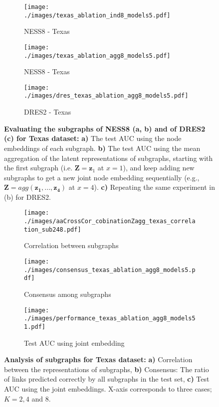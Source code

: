 \documentclass{article}
\begin{document}
\begin{figure}[ht]
\vskip 0.2in
\begin{center}
     \begin{subfigure}[c]{0.32\columnwidth}
        \texttt{[image: ./images/texas\_ablation\_ind8\_models5.pdf]}
         \caption{NESS8 - Texas}
     \end{subfigure}
     \begin{subfigure}[c]{0.29\columnwidth}
        \texttt{[image: ./images/texas\_ablation\_agg8\_models5.pdf]}
         \caption{NESS8 - Texas}
     \end{subfigure}
     \begin{subfigure}[c]{0.32\columnwidth}
        \texttt{[image: ./images/dres\_texas\_ablation\_agg8\_models5.pdf]}
         \caption{DRES2 - Texas}
     \end{subfigure}

\caption{\textbf{Evaluating the subgraphs of NESS8 (a, b) and of DRES2 (c) for Texas dataset:} \textbf{a)} The test AUC using the node embeddings of each subgraph. \textbf{b)} The test AUC using the mean aggregation of the latent representations of subgraphs, starting with the first subgraph (i.e. $\bm Z=\bm z_1$ at $x=1$), and keep adding new subgraphs to get a new joint node embedding sequentially (e.g., $\pmb{Z}=agg(\pmb{z_1}, ..., \pmb{z_4})$ at $x=4$). \textbf{c)} Repeating the same experiment in (b) for DRES2.}\label{fig:gradual_aggregation_performance_texas}
\end{center}
\vskip -0.2in
\end{figure}


\begin{figure}[h]
\vskip 0.2in
\begin{center}
     \begin{subfigure}[c]{0.32\columnwidth}
        \texttt{[image: ./images/aaCrossCor\_cobinationZagg\_texas\_correlation\_sub248.pdf]}
         \caption{Correlation between subgraphs}
     \end{subfigure}
     \begin{subfigure}[c]{0.32\columnwidth}
        \texttt{[image: ./images/consensus\_texas\_ablation\_agg8\_models5.pdf]}
         \caption{Consensus among subgraphs}
     \end{subfigure}
     \begin{subfigure}[c]{0.32\columnwidth}
        \texttt{[image: ./images/performance\_texas\_ablation\_agg8\_models51.pdf]}
         \caption{Test AUC using joint embedding}
     \end{subfigure}
\caption{\textbf{Analysis of subgraphs for Texas dataset:} \textbf{a)} Correlation between the representations of subgraphs,  \textbf{b)} Consensus: The ratio of links predicted correctly by all subgraphs in the test set,  \textbf{c)} Test AUC using the joint embeddings. X-axis corresponds to three cases; $K=2, 4$ and $8$.}\label{fig:analysis_subgraphs_texas}
\end{center}
\vskip -0.2in
\end{figure}
\end{document}
